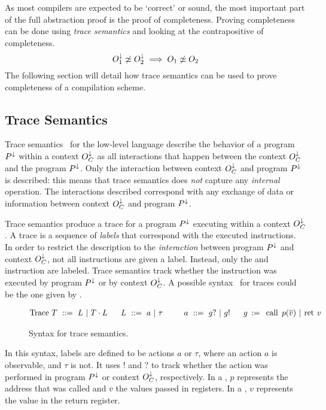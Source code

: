 As most compilers are expected to be `correct' or sound, the most important part of the full abstraction proof is the proof of completeness.
Proving completeness can be done using \emph{trace semantics} and looking at the contrapositive of completeness.
\[
    O_{1}^{\downarrow} \not\simeq O_{2}^{\downarrow} \implies O_{1} \not\simeq O_{2}
\]
The following section will detail how trace semantics can be used to prove completeness of a compilation scheme.

\subsection{Trace Semantics}
\label{sec:tracesemantics}
Trace semantics~\cite{Rathke, Patrignani:TraceSemantics} for the low-level language describe the behavior of a program $P^{\downarrow}$ within a context $O_C^{\downarrow}$ as all interactions that happen between the context $O_C^{\downarrow}$ and the program $P^{\downarrow}$.
Only the interaction between context $O_C^{\downarrow}$ and program $P^{\downarrow}$ is described: this means that trace semantics does \emph{not} capture any \emph{internal} operation.
The interactions described correspond with any exchange of data or information between context $O_C^{\downarrow}$ and program $P^{\downarrow}$.

Trace semantics produce a trace for a program $P^{\downarrow}$ executing within a context $O_C^{\downarrow}$.
A trace is a sequence of \emph{labels} that correspond with the executed instructions.
In order to restrict the description to the \emph{interaction} between program $P^{\downarrow}$ and context $O_C^{\downarrow}$, not all instructions are given a label.
Instead, only the  and  instruction are labeled.
Trace semantics track whether the instruction was executed by program $P^{\downarrow}$ or by context $O_C^{\downarrow}$.
A possible syntax~\cite{Patrignani:TraceSemantics} for traces could be the one given by .
\newcommand{\fs}{\;\;\;}
\vspace{-1.5em}
{\setlength{\abovecaptionskip}{0pt}
\begin{figure}[H]
\begin{align*}
\begin{aligned}
\text{Trace\ } T\ ::=\ L\ |\ T\cdot L \fs & \fs L\ ::=\ a\ |\ \tau \fs & \fs a\ ::=\ g?\ |\ g! \fs & \fs g \::=\ \kw{call}\ p(\overline{v})\ |\ \kw{ret}\ v
\end{aligned}
\end{align*}
\caption{Syntax for trace semantics\label{fig:tracesemanticssyntax}.}
\end{figure}
}
\vspace{-1em}
In this syntax, labels are defined to be actions $a$ or $\tau$, where an action $a$ is observable, and $\tau$ is not.
It uses $!$ and $?$ to track whether the action was performed in program $P^{\downarrow}$ or context $O_C^{\downarrow}$, respectively.
In a , $p$ represents the address that was called and $\overline{v}$ the values passed in registers.
In a , $v$ represents the value in the return register.

